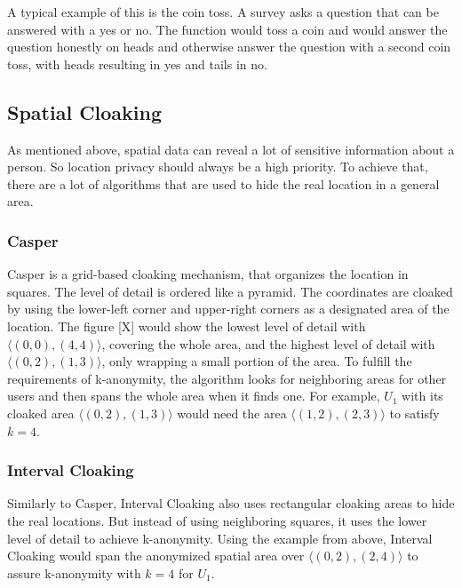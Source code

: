 A typical example of this is the coin toss. A survey asks a question that can be answered with a yes or no. The function would toss a coin and would answer the question honestly on heads and otherwise answer the question with a second coin toss, with heads resulting in yes and tails in no. 

\subsection{Spatial Cloaking}
As mentioned above, spatial data can reveal a lot of sensitive information about a person. So location privacy should always be a high priority. To achieve that, there are a lot of algorithms that are used to hide the real location in a general area.

\subsubsection{Casper}
Casper
is a grid-based cloaking mechanism, that organizes the location in squares. The level of detail is ordered like a pyramid. The coordinates are cloaked by using the lower-left corner and upper-right corners as a designated area of the location. The figure [X] would show the lowest level of detail with \(\langle(0,0),(4,4)\rangle\), covering the whole area, and the highest level of detail with \(\langle(0,2),(1,3)\rangle\), only wrapping a small portion of the area. To fulfill the requirements of k-anonymity, the algorithm looks for neighboring areas for other users and then spans the whole area when it finds one. For example, \(U_1\) with its cloaked area \(\langle(0,2),(1,3)\rangle\) would need the area \(\langle(1,2),(2,3)\rangle\) to satisfy \(k=4\).

\subsubsection{Interval Cloaking}
Similarly to Casper, Interval Cloaking also uses rectangular cloaking areas to hide the real locations. But instead of using neighboring squares, it uses the lower level of detail to achieve k-anonymity. Using the example from above, Interval Cloaking would span the anonymized spatial area over \(\langle(0,2),(2,4)\rangle\) to assure k-anonymity with \(k=4\) for \(U_1\).

